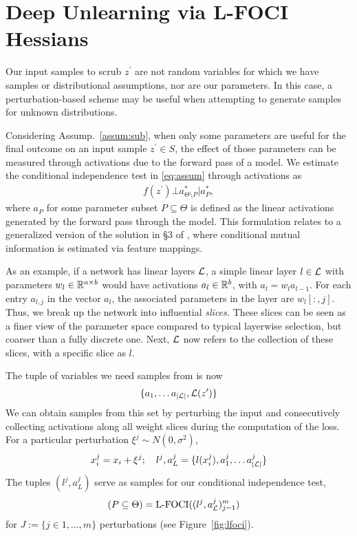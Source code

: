 \section{Deep Unlearning via L-FOCI Hessians}
\label{sec:deepunlearn}

Our input samples to scrub $z^\prime$ are not random variables for which we have samples or distributional assumptions, nor are our parameters. In this case, 
a perturbation-based scheme may be useful when attempting to generate samples for unknown distributions.

Considering Assump.~\ref{assum:sub}, when only some parameters are useful for the final outcome on an input sample $z^\prime \in S$, the effect of those parameters can be measured through activations due to the forward pass of a model. We estimate the conditional independence test in \eqref{eq:assum} through activations as
\begin{align}
    f(z^\prime) \bot a_{\Theta\setminus P}^* | a_P^*,
\end{align}
where $a_P$ for some parameter subset $P \subseteq \Theta$ is defined as the linear activations generated by the forward pass through the model.
This formulation relates to a generalized version of the solution in \S3 of \cite{bullseye}, where conditional mutual information is estimated via feature mappings.

As an example, if a network has linear layers $\mathcal{L}$, a simple linear layer $l \in \mathcal{L}$ with parameters $w_l \in \mathbb{R}^{a \times b}$ would have activations $a_l \in \mathbb{R}^b$, with $a_l = w_l a_{l-1}$. For each entry $a_{l,j}$ in the vector $a_l$, the associated parameters in the layer are $w_l[:,j]$. Thus, we break up the network into influential \textit{slices.} These slices can be seen as a finer view of the parameter space compared to typical layerwise selection, but coarser than a fully discrete one. Next, $\mathcal{L}$ now refers to the collection of these slices, with a specific slice as $l$.

The tuple of variables we need samples from is now
\begin{align}
    \{a_1, \ldots a_{|\mathcal{L}|}, \mathcal{L}(z^\prime)\}
\end{align}
We can obtain samples from this set by perturbing the input and consecutively collecting activations along all weight slices during the computation of the loss. For a particular perturbation $\xi^j \sim N(0,\sigma^2)$,
\begin{align}
    x_i^j = x_i + \xi^j; \quad
    l^j, a_L^j = \{l(x_i^j), a_1^j, \ldots a_{|\mathcal{L}|}^j\}
\end{align}
The tuples $(l^j, a_L^j)$ serve as samples for our conditional independence test, 
\begin{align}
    (P \subseteq \Theta) &= \mbox{L-FOCI}((l^j, a_{\mathcal{L}}^j)_{j=1}^m)
\end{align}
for $J:=\{j \in 1,\ldots,m\}$ perturbations (see Figure~\ref{fig:lfoci}).


